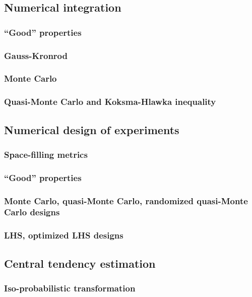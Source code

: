        \subsection{Numerical integration}
            \subsubsection{``Good'' properties}
            \subsubsection{Gauss-Kronrod}
            \subsubsection{Monte Carlo}
            \subsubsection{Quasi-Monte Carlo and Koksma-Hlawka inequality}
        \subsection{Numerical design of experiments}
            \subsubsection{Space-filling metrics}
            \subsubsection{``Good'' properties}
            \subsubsection{Monte Carlo, quasi-Monte Carlo, randomized quasi-Monte Carlo designs}
            \subsubsection{LHS, optimized LHS designs}
        \subsection{Central tendency estimation}
            \subsubsection{Iso-probabilistic transformation}
